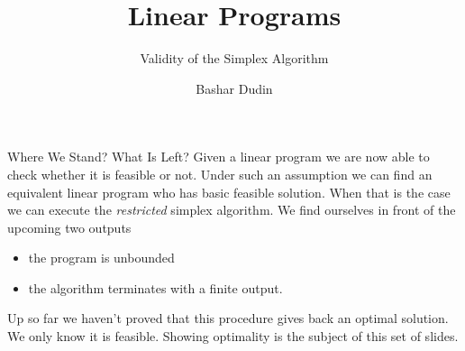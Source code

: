 \documentclass[32pt, aspectratio = 169]{beamer}
\author[BD]{Bashar Dudin}
\institute[]{EPITA}
\title{Linear Programs} %
\subtitle{Validity of the Simplex Algorithm}
\begin{document}
\begin{frame}[plain]
    \titlepage %
\end{frame}

\begin{frame}{Where We Stand? What Is Left?}
  Given a linear program we are now able to check whether it is
  feasible or not. Under such an assumption we can find an equivalent
  linear program who has basic feasible solution. When that is the
  case we can execute the \textit{restricted} simplex algorithm. We
  find ourselves in front of the upcoming two outputs
    \begin{itemize}
        \item the program is unbounded
        \item the algorithm terminates with a finite output.
    \end{itemize}
    Up so far we haven't proved that this procedure gives back an
    optimal solution. We only know it is feasible. Showing optimality
    is the subject of this set of slides.
\end{frame}
\end{document}
